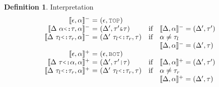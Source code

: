 \documentclass[acmsmall]{acmart}
\theoremstyle{definition}
\newtheorem{definition}{Definition}[section]
\begin{document}
\begin{definition} 
  \label{def:interpretation}
  Interpretation
  \hfill
  \boxed{
    \llbracket\Delta, \alpha \rrbracket^\pm = (\Delta, \tau)
  }
  \\
  \[
  \begin{array}[t]{r@{}c@{}lcl}

      \llbracket \epsilon, \alpha \rrbracket^-
      &\ =\ & 
      (\epsilon, \J{TOP})

      \\

      \llbracket \Delta \ \alpha  \J{<:} \tau, \alpha \rrbracket^- 
      &\ =\ & 
      (\Delta', \tau' \J{\&} \tau)
      &\text{if}& 
      \llbracket \Delta, \alpha \rrbracket^- = (\Delta', \tau')

      \\

      \llbracket \Delta \ \tau_l \J{<:} \tau_r, \alpha \rrbracket^- 
      &\ =\ & 
      (\Delta' \ \tau_l \J{<:} \tau_r, \tau)
      &\text{if}& 
      \begin{array}[t]{@{}l}
        \alpha \neq \tau_l
        \\
        \llbracket \Delta, \alpha \rrbracket^- = (\Delta', \tau)
      \end{array}

      \\

      \llbracket \epsilon, \alpha \rrbracket^+ 
      &\ =\ & 
      (\epsilon, \J{BOT})

      \\

      \llbracket \Delta \  \tau \J{<:} \alpha  , \alpha \rrbracket^+ 
      &\ =\ & 
      (\Delta', \tau' \J{|} \tau)
      &\text{if}& 
      \llbracket \Delta, \alpha \rrbracket^+ = (\Delta', \tau')

      \\

      \llbracket \Delta \ \tau_l \J{<:} \tau_r, \alpha \rrbracket^+ 
      &\ =\ & 
      (\Delta' \ \tau_l \J{<:} \tau_r, \tau)
      &\text{if}& 
      \begin{array}[t]{@{}l}
        \alpha \neq \tau_r
        \\
        \llbracket \Delta, \alpha \rrbracket^+ = (\Delta', \tau)
      \end{array}
  \end{array}
  \]
\end{definition}

\end{document}
